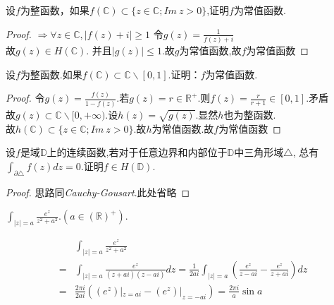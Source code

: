 \begin{eg}
	设$f$为整函数，如果$f(\mathbb{C})\subset\{z\in\mathbb{C};I\!m\ z>0\}$,证明$f$为常值函数.
\end{eg}
\begin{proof}
	$\Rightarrow \forall z\in \mathbb{C}, |f(z)+i|\geq 1$ \quad 令$\displaystyle{g(z)=\frac{1}{f(z)+i}}$\\
	故$g(z)\in H(\mathbb{C})$. 并且\quad$|g(z)|\leq1$.故$g$为常值函数,故$f$为常值函数
\end{proof}

\begin{eg}
	设$f$为整函数.如果$f(\mathbb{C})\subset\mathbb{C}\backslash[0,1]$.证明：$f$为常值函数.
\end{eg}
\begin{proof}
	令$\displaystyle{g(z)=\frac{f(z)}{1-f(z)}}$.若$g(z)=r\in\mathbb{R}^+$.则$\displaystyle{f(z)=\frac{r}{r+1}\in[0,1]}$.矛盾\\
	故$g(z)\subset\mathbb{C}\backslash[0,+\infty)$.设$h(z)=\sqrt{g(z)}$.显然$h$也为整函数.\\
	故$h(\mathbb{C})\subset\{z\in\mathbb{C};I\!m\ z>0\}$.故$h$为常值函数.故$f$为常值函数
\end{proof}

\begin{eg}[更强形式的Morera]
	设$f$是域$\mathbb{D}$上的连续函数,若对于任意边界和内部位于$\mathbb{D}$中三角形域$\triangle$,
	总有$\int_{\partial\triangle}f(z)dz=0$.证明$f\in H(\mathbb{D})$.
\end{eg}
\begin{proof}
	思路同\emph{Cauchy-Gousart}.此处省略
\end{proof}

\begin{eg}
	$\displaystyle{\int_{|z|=a}\frac{e^z}{z^2+a^2}.(a\in\mathbb{(R)^+})}$.
\end{eg}
\begin{jie}
	\begin{align*}
	&\int_{|z|=a}\frac{e^z}{z^2+a^2}\\
	=&\int_{|z|=a}\frac{e^z}{(z+ai)(z-ai)}dz=\frac{1}{2ai}\int_{|z|=a}\left(\frac{e^z}{z-ai}-\frac{e^z}{z+ai}\right)dz\\
	=&\frac{2\pi i}{2ai}\left((e^z)|_{z=ai}-(e^z)|_{z=-ai}\right)=\frac{2\pi i}{a}\sin a
	\end{align*}
\end{jie}

